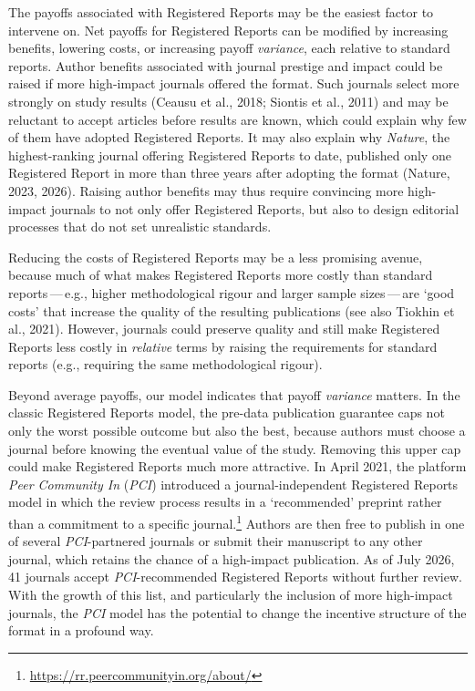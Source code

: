 \documentclass[
  british,
  a4paper,
  ,man,floatsintext]{apa6}
\begin{document}
The payoffs associated with Registered Reports may be the easiest factor to intervene on.
Net payoffs for Registered Reports can be modified by increasing benefits, lowering costs, or increasing payoff \emph{variance}, each relative to standard reports.
Author benefits associated with journal prestige and impact could be raised if more high-impact journals offered the format.
Such journals select more strongly on study results (Ceausu et al., 2018; Siontis et al., 2011) and may be reluctant to accept articles before results are known, which could explain why few of them have adopted Registered Reports.
It may also explain why \emph{Nature}, the highest-ranking journal offering Registered Reports to date, published only one Registered Report in more than three years after adopting the format (Nature, 2023, 2026).
Raising author benefits may thus require convincing more high-impact journals to not only offer Registered Reports, but also to design editorial processes that do not set unrealistic standards.

Reducing the costs of Registered Reports may be a less promising avenue, because much of what makes Registered Reports more costly than standard reports\(\,\)---\(\,\)e.g., higher methodological rigour and larger sample sizes\(\,\)---\(\,\)are `good costs' that increase the quality of the resulting publications (see also Tiokhin et al., 2021).
However, journals could preserve quality and still make Registered Reports less costly in \emph{relative} terms by raising the requirements for standard reports (e.g., requiring the same methodological rigour).

Beyond average payoffs, our model indicates that payoff \emph{variance} matters.
In the classic Registered Reports model, the pre-data publication guarantee caps not only the worst possible outcome but also the best, because authors must choose a journal before knowing the eventual value of the study.
Removing this upper cap could make Registered Reports much more attractive.
In April 2021, the platform \emph{Peer Community In} (\emph{PCI}) introduced a journal-independent Registered Reports model in which the review process results in a `recommended' preprint rather than a commitment to a specific journal.\footnote{\url{https://rr.peercommunityin.org/about/}}
Authors are then free to publish in one of several \emph{PCI}-partnered journals or submit their manuscript to any other journal, which retains the chance of a high-impact publication.
As of July 2026, 41 journals accept \emph{PCI}-recommended Registered Reports without further review.
With the growth of this list, and particularly the inclusion of more high-impact journals, the \emph{PCI} model has the potential to change the incentive structure of the format in a profound way.
\end{document}
